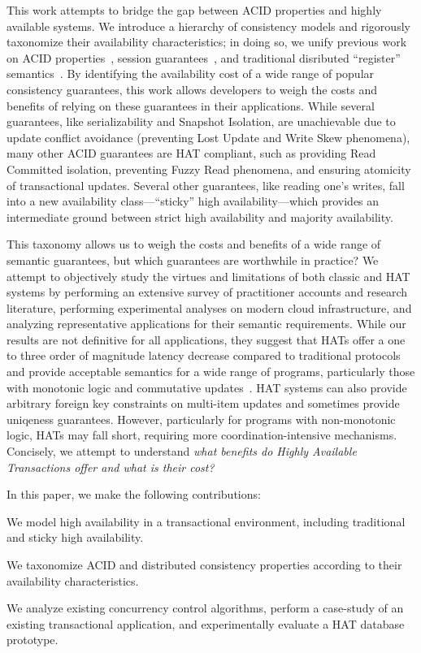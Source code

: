 This work attempts to bridge the gap between ACID properties and
highly available systems. We introduce a hierarchy of consistency
models and rigorously taxonomize their availability characteristics;
in doing so, we unify previous work on ACID properties~\cite{adya},
session guarantees~\cite{sessionguarantees}, and traditional
disributed ``register'' semantics~\cite{herlihy-art}. By identifying
the availability cost of a wide range of popular consistency
guarantees, this work allows developers to weigh the costs and
benefits of relying on these guarantees in their applications. While
several guarantees, like serializability and Snapshot Isolation, are
unachievable due to update conflict avoidance (preventing Lost Update
and Write Skew phenomena), many other ACID guarantees are HAT
compliant, such as providing Read Committed isolation, preventing
Fuzzy Read phenomena, and ensuring atomicity of transactional
updates. Several other guarantees, like reading one's writes, fall
into a new availability class---``sticky'' high availability---which
provides an intermediate ground between strict high availability and
majority availability.

This taxonomy allows us to weigh the costs and benefits of a wide
range of semantic guarantees, but which guarantees are worthwhile in
practice? We attempt to objectively study the virtues and limitations
of both classic and HAT systems by performing an extensive survey of
practitioner accounts and research literature, performing experimental
analyses on modern cloud infrastructure, and analyzing representative
applications for their semantic requirements. While our results are
not definitive for all applications, they suggest that HATs offer a
one to three order of magnitude latency decrease compared to
traditional protocols and provide acceptable semantics for a wide
range of programs, particularly those with monotonic logic and
commutative updates~\cite{calm, blooml, crdt}. HAT systems can also
provide arbitrary foreign key constraints on multi-item updates and
sometimes provide uniqeness guarantees. However, particularly for
programs with non-monotonic logic, HATs may fall short, requiring more
coordination-intensive mechanisms. Concisely, we attempt to understand
\textit{what benefits do Highly Available Transactions offer and what
  is their cost?}

In this paper, we make the following contributions:
\begin{myitemize}
\item We model high availability in a transactional environment,
  including traditional and sticky high availability.

\item We taxonomize ACID and distributed consistency properties
  according to their availability characteristics.

\item We analyze existing concurrency control algorithms, perform a
  case-study of an existing transactional application, and
  experimentally evaluate a HAT database prototype.
\end{myitemize}

